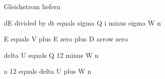 Gleichstrom liefern

dE divided by dt equals sigma Q i minus sigma W n

E equals V plus E zero plus D arrow zero

delta U equals Q 12 minus W n

a 12 equals delta U plus W n
